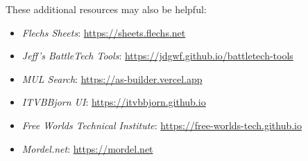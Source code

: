 These additional resources may also be helpful:

\begin{itemize}

\item \emph{Flechs Sheets}: \href{https://sheets.flechs.net}{https://sheets.flechs.net}

\item \emph{Jeff's BattleTech Tools}: \href{https://jdgwf.github.io/battletech-tools}{https://jdgwf.github.io/battletech-tools}

\item \emph{MUL Search}: \href{https://as-builder.vercel.app}{https://as-builder.vercel.app}

\item \emph{ITVBBjorn UI}: \href{https://itvbbjorn.github.io}{https://itvbbjorn.github.io}

\item \emph{Free Worlds Technical Institute}: \href{https://free-worlds-tech.github.io}{https://free-worlds-tech.github.io}

\item \emph{Mordel.net}: \href{https://mordel.net}{https://mordel.net}

\end{itemize}
